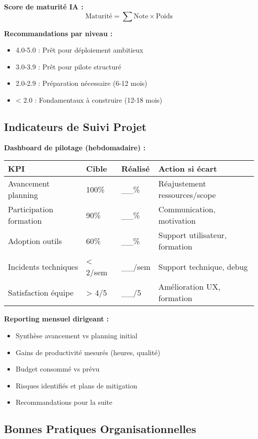 \textbf{Score de maturité IA :}
\[
\text{Maturité} = \sum \text{Note} \times \text{Poids}
\]

\textbf{Recommandations par niveau :}
\begin{itemize}
    \item 4.0-5.0 : Prêt pour déploiement ambitieux
    \item 3.0-3.9 : Prêt pour pilote structuré
    \item 2.0-2.9 : Préparation nécessaire (6-12 mois)
    \item < 2.0 : Fondamentaux à construire (12-18 mois)
\end{itemize}

\subsection{Indicateurs de Suivi Projet}

\textbf{Dashboard de pilotage (hebdomadaire) :}

\begin{longtable}{@{}p{4cm}p{3cm}p{3cm}p{4cm}@{}}
\toprule
\textbf{KPI} & \textbf{Cible} & \textbf{Réalisé} & \textbf{Action si écart} \\
\midrule
Avancement planning & 100\% & \_\_\% & Réajustement ressources/scope \\
Participation formation & 90\% & \_\_\% & Communication, motivation \\
Adoption outils & 60\% & \_\_\% & Support utilisateur, formation \\
Incidents techniques & < 2/sem & \_\_/sem & Support technique, debug \\
Satisfaction équipe & > 4/5 & \_\_/5 & Amélioration UX, formation \\
\bottomrule
\end{longtable}

\textbf{Reporting mensuel dirigeant :}
\begin{itemize}
    \item Synthèse avancement vs planning initial
    \item Gains de productivité mesurés (heures, qualité)
    \item Budget consommé vs prévu
    \item Risques identifiés et plans de mitigation
    \item Recommandations pour la suite
\end{itemize}

\subsection{Bonnes Pratiques Organisationnelles}

